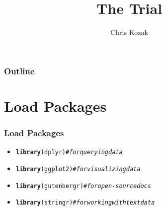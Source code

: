 \documentclass[10pt]{beamer}\usepackage[]{graphicx}\usepackage[]{color}
\makeatletter
\newcommand{\hlcom}[1]{\textcolor[rgb]{0.678,0.584,0.686}{\textit{#1}}}%
\newcommand{\hlstd}[1]{\textcolor[rgb]{0.345,0.345,0.345}{#1}}%
\newcommand{\hlkwd}[1]{\textcolor[rgb]{0.737,0.353,0.396}{\textbf{#1}}}%
\newenvironment{kframe}{%
 \def\at@end@of@kframe{}%
 \ifinner\ifhmode%
  \def\at@end@of@kframe{\end{minipage}}%
  \begin{minipage}{\columnwidth}%
 \fi\fi%
 \def\FrameCommand##1{\hskip\@totalleftmargin \hskip-\fboxsep
 \colorbox{shadecolor}{##1}\hskip-\fboxsep
     \hskip-\linewidth \hskip-\@totalleftmargin \hskip\columnwidth}%
 \MakeFramed {\advance\hsize-\width
   \@totalleftmargin\z@ \linewidth\hsize
   \@setminipage}}%
 {\par\unskip\endMakeFramed%
 \at@end@of@kframe}
\newenvironment{knitrout}{}{} %
\makeatother
\begin{document}
\title{The Trial}
\author{Chris Kozak}

\begin{frame}
  \titlepage
\end{frame}

\begin{frame}
  \frametitle{Outline}
    \tableofcontents
\end{frame}

\section{Load Packages}
\begin{frame}[fragile]
  \frametitle{Load Packages}
    \begin{itemize}
      \item
\begin{knitrout}
\color{fgcolor}\begin{kframe}
\begin{alltt}
\hlkwd{library}\hlstd{(dplyr)} \hlcom{#for querying data}
\end{alltt}
\end{kframe}
\end{knitrout}
      \item
\begin{knitrout}
\color{fgcolor}\begin{kframe}
\begin{alltt}
\hlkwd{library}\hlstd{(ggplot2)} \hlcom{#for visualizing data}
\end{alltt}
\end{kframe}
\end{knitrout}
      \item
\begin{knitrout}
\color{fgcolor}\begin{kframe}
\begin{alltt}
\hlkwd{library}\hlstd{(gutenbergr)} \hlcom{#for open-source docs}
\end{alltt}
\end{kframe}
\end{knitrout}
      \item
\begin{knitrout}
\color{fgcolor}\begin{kframe}
\begin{alltt}
\hlkwd{library}\hlstd{(stringr)} \hlcom{#for working with text data}

\end{alltt}
\end{kframe}
\end{knitrout}
\end{itemize}
\end{frame}
\end{document}
